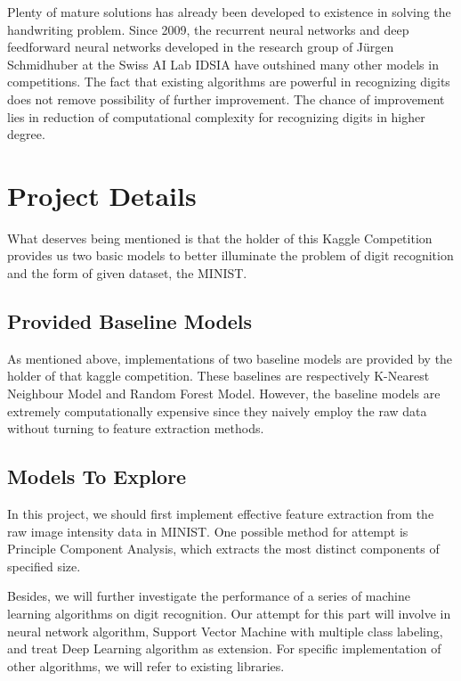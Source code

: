 \documentclass{article} %
\begin{document}
Plenty of mature solutions has already been developed to existence in solving
the handwriting problem. 
Since 2009, the recurrent neural networks and deep feedforward neural networks
developed in the research group of Jürgen Schmidhuber at the Swiss AI Lab
IDSIA have outshined many other models in competitions.
The fact that existing algorithms are powerful in recognizing digits does not
remove possibility of further improvement. The chance of improvement lies in
reduction of computational complexity for recognizing digits in higher degree.



\section{Project Details}

What deserves being mentioned is that the holder of this Kaggle Competition
provides us two basic models to better illuminate the problem of digit
recognition and the form of given dataset, the MINIST.

\subsection{Provided Baseline Models}
As mentioned above, implementations of two baseline models are provided by the
holder of that kaggle competition. These baselines are respectively K-Nearest
Neighbour Model and Random Forest Model. However, the baseline models are
extremely computationally expensive since they naively employ the raw data
without turning to feature extraction methods. 

\subsection{Models To Explore}
In this project, we should first implement effective feature extraction from
the raw image intensity data in MINIST. One possible method for attempt is
Principle Component Analysis, which extracts the most distinct components of
specified size. 

Besides, we will further investigate the performance of a series of machine learning
algorithms on digit recognition. Our attempt for this part will involve in
neural network algorithm, Support Vector Machine with multiple class labeling,
and treat Deep Learning algorithm as extension. For specific implementation of
other algorithms, we will refer to existing libraries.
\end{document}
